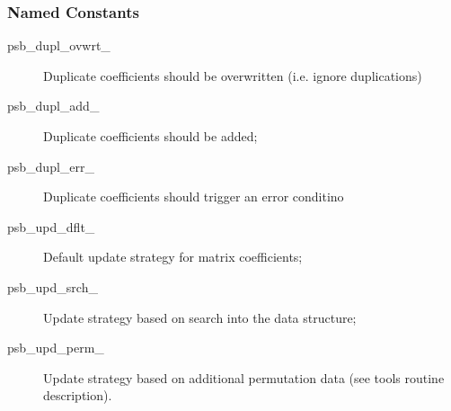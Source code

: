 \subsubsection{Named Constants}
\label{sec:sp_constants}
\begin{description}
\item[psb\_dupl\_ovwrt\_] Duplicate coefficients should be overwritten
  (i.e. ignore duplications)
\item[psb\_dupl\_add\_] Duplicate coefficients should be added;	         
\item[psb\_dupl\_err\_] Duplicate coefficients should trigger an error conditino
\item[psb\_upd\_dflt\_] Default update strategy for matrix coefficients;
\item[psb\_upd\_srch\_] Update strategy based on search into the data structure;
\item[psb\_upd\_perm\_] Update strategy based on additional
  permutation data (see tools routine description).
\end{description}



